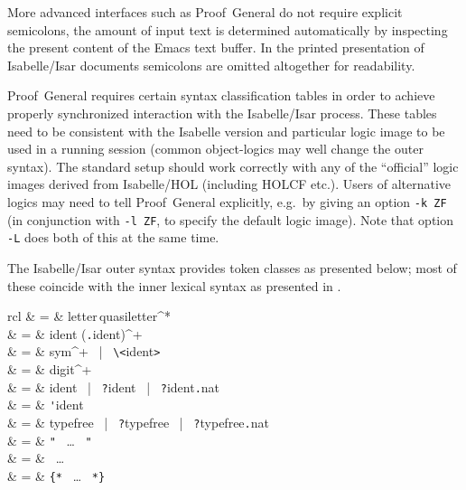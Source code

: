 \begin{isabellebody}
\begin{isamarkuptext}
  More advanced interfaces such as Proof~General \cite{proofgeneral}
  do not require explicit semicolons, the amount of input text is
  determined automatically by inspecting the present content of the
  Emacs text buffer.  In the printed presentation of Isabelle/Isar
  documents semicolons are omitted altogether for readability.

  \begin{warn}
    Proof~General requires certain syntax classification tables in
    order to achieve properly synchronized interaction with the
    Isabelle/Isar process.  These tables need to be consistent with
    the Isabelle version and particular logic image to be used in a
    running session (common object-logics may well change the outer
    syntax).  The standard setup should work correctly with any of the
    ``official'' logic images derived from Isabelle/HOL (including
    HOLCF etc.).  Users of alternative logics may need to tell
    Proof~General explicitly, e.g.\ by giving an option \verb|-k ZF|
    (in conjunction with \verb|-l ZF|, to specify the default
    logic image).  Note that option \verb|-L| does both
    of this at the same time.
  \end{warn}%
\end{isamarkuptext}%
\isamarkuptrue%
%
\isamarkuptrue%
%
\begin{isamarkuptext}%
The Isabelle/Isar outer syntax provides token classes as presented
  below; most of these coincide with the inner lexical syntax as
  presented in \cite{isabelle-ref}.

  \begin{matharray}{rcl}
     & = & letter\,quasiletter^* \\
     & = & ident (\verb,.,ident)^+ \\
     & = & sym^+ ~|~ \verb,\,\verb,<,ident\verb,>, \\
     & = & digit^+ \\
     & = & ident ~|~ \verb,?,ident ~|~ \verb,?,ident\verb,.,nat \\
     & = & \verb,',ident \\
     & = & typefree ~|~ \verb,?,typefree ~|~ \verb,?,typefree\verb,.,nat \\
     & = & \verb,", ~\dots~ \verb,", \\
     & = & \backquote ~\dots~ \backquote \\
     & = & \verb,{*, ~\dots~ \verb,*,\verb,}, \\[1ex]


\end{matharray}
\end{isamarkuptext}
\end{isabellebody}
